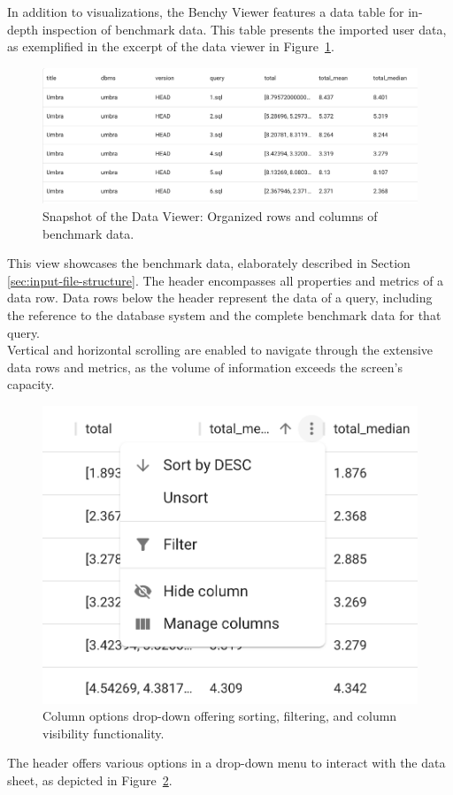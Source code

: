In addition to visualizations, the Benchy Viewer features a data table for in-depth inspection of benchmark data. This table presents the imported user data, as exemplified in the excerpt of the data viewer in Figure~\ref{fig:data-viewer}.

\begin{figure}[h]
  \centering
  \includegraphics[width=0.9\linewidth]{figures/data-viewer.png}
  \caption{Snapshot of the Data Viewer: Organized rows and columns of benchmark data.}
  \label{fig:data-viewer}
\end{figure}

This view showcases the benchmark data, elaborately described in Section \ref{sec:input-file-structure}. The header encompasses all properties and metrics of a data row. Data rows below the header represent the data of a query, including the reference to the database system and the complete benchmark data for that query.\\
Vertical and horizontal scrolling are enabled to navigate through the extensive data rows and metrics, as the volume of information exceeds the screen's capacity.

\begin{figure}[h]
  \centering
  \includegraphics[width=0.4\linewidth]{figures/data-viewer-header-options.png}
  \caption{Column options drop-down offering sorting, filtering, and column visibility functionality.}
  \label{fig:data-viewer-options}
\end{figure}

The header offers various options in a drop-down menu to interact with the data sheet, as depicted in Figure~\ref{fig:data-viewer-options}.

